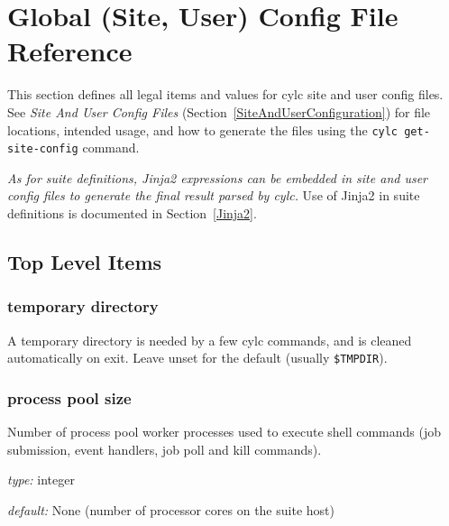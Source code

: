 \section{Global (Site, User) Config File Reference}
\label{SiteRCReference}

\lstset{language=transcript}

This section defines all legal items and values for cylc site and
user config files. See {\em Site And User Config Files}
(Section~\ref{SiteAndUserConfiguration}) for file locations, intended
usage, and how to generate the files using the
\lstinline=cylc get-site-config= command.

{\em As for suite definitions, Jinja2 expressions can be embedded in
site and user config files to generate the final result parsed by cylc.}
Use of Jinja2 in suite definitions is documented in
Section~\ref{Jinja2}.

\subsection{Top Level Items}

\subsubsection{temporary directory}

A temporary directory is needed by a few cylc commands, and is cleaned
automatically on exit. Leave unset for the default (usually
\lstinline=$TMPDIR=).


\subsubsection{process pool size}

Number of process pool worker processes used to execute shell commands
(job submission, event handlers, job poll and kill commands).

\begin{myitemize}
\item {\em type:} integer
\item {\em default:} None (number of processor cores on the suite host)
\end{myitemize}

